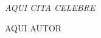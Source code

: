 \cleardoublepage %



\chapter*{}
\setlength{\leftmargin}{0.5\textwidth}
\setlength{\parsep}{0cm}
\addtolength{\topsep}{0.5cm}
\begin{flushright}
	\small\em{
		AQUI CITA CELEBRE
	}
\end{flushright}
\begin{flushright}
	\small{
		AQUI AUTOR
	}
\end{flushright}

\cleardoublepage %

